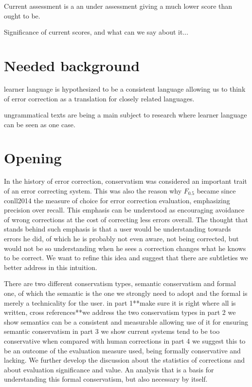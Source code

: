 \documentclass[english]{article}
\begin{document}
Current assessment is a an under assessment giving a much lower score
than ought to be.

Significance of current scores, and what can we say about it...

\section{Needed background}

learner language is hypothesized to be a consistent language allowing
us to think of error correction as a translation for closely related
languages.

ungrammatical texts are being a main subject to research where learner
language can be seen as one case.

\section{Opening}

In the history of error correction, conservatism was considered an
important trait of an error correcting system\cite{brockett2006correcting}.
This was also the reason why $F_{0.5}$ became since conll2014\cite{ng2014conll}
the measure of choice for error correction evaluation, emphasizing
precision over recall. This emphasis can be understood as encouraging
avoidance of wrong corrections at the cost of correcting less errors
overall. The thought that stands behind such emphasis is that a user
would be understanding towards errors he did, of which he is probably
not even aware, not being corrected, but would not be so understanding
when he sees a correction changes what he knows to be correct. We want to refine
this idea and suggest that there are subtleties we better address
in this intuition.

There are two different conservatism
types, semantic conservatism and formal one, of which the semantic
is the one we strongly need to adopt and the formal is merely a technicality
for the user. in part 1{*}{*}make sure it is right where all is written,
cross references{*}{*}we address the two conservatism types in part
2 we show semantics can be a consistent and measurable allowing use
of it for ensuring semantic conservatism in part 3 we show current
systems tend to be too conservative when compared with human
corrections in part 4 we suggest this to be an outcome of the evaluation
measure used, being formally conservative and lacking. We further develop
 the discussion about the statistics of corrections 
 and about evaluation significance and value. 
 An analysis that is a basis for understanding this formal conservatism, 
 but also necessary by itself.
\end{document}
